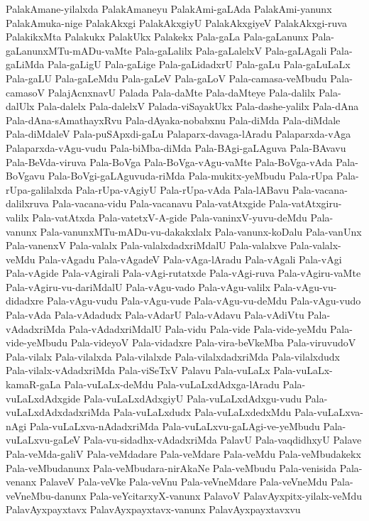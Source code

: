 {PalakAmane-yilalxda
PalakAmaneyu
PalakAmi-gaLAda
PalakAmi-yanunx
PalakAmuka-nige
PalakAkxgi
PalakAkxgiyU
PalakAkxgiyeV
PalakAkxgi-ruva
PalakikxMta
Palakukx
PalakUkx
Palakekx
Pala-gaLa
Pala-gaLanunx
Pala-gaLanunxMTu-mADu-vaMte
Pala-gaLalilx
Pala-gaLalelxV
Pala-gaLAgali
Pala-gaLiMda
Pala-gaLigU
Pala-gaLige
Pala-gaLidadxrU
Pala-gaLu
Pala-gaLuLaLx
Pala-gaLU
Pala-gaLeMdu
Pala-gaLeV
Pala-gaLoV
Pala-camasa-veMbudu
Pala-camasoV
PalajAcnxnavU
Palada
Pala-daMte
Pala-daMteye
Pala-dalilx
Pala-dalUlx
Pala-dalelx
Pala-dalelxV
Palada-viSayakUkx
Pala-dashe-yalilx
Pala-dAna
Pala-dAna-sAmathayxRvu
Pala-dAyaka-nobabxnu
Pala-diMda
Pala-diMdale
Pala-diMdaleV
Pala-puSApxdi-gaLu
Palaparx-davaga-lAradu
Palaparxda-vAga
Palaparxda-vAgu-vudu
Pala-biMba-diMda
Pala-BAgi-gaLAguva
Pala-BAvavu
Pala-BeVda-viruva
Pala-BoVga
Pala-BoVga-vAgu-vaMte
Pala-BoVga-vAda
Pala-BoVgavu
Pala-BoVgi-gaLAguvuda-riMda
Pala-mukitx-yeMbudu
Pala-rUpa
Pala-rUpa-galilalxda
Pala-rUpa-vAgiyU
Pala-rUpa-vAda
Pala-lABavu
Pala-vacana-dalilxruva
Pala-vacana-vidu
Pala-vacanavu
Pala-vatAtxgide
Pala-vatAtxgiru-valilx
Pala-vatAtxda
Pala-vatetxV-A-gide
Pala-vaninxV-yuvu-deMdu
Pala-vanunx
Pala-vanunxMTu-mADu-vu-dakakxlalx
Pala-vanunx-koDalu
Pala-vanUnx
Pala-vanenxV
Pala-valalx
Pala-valalxdadxriMdalU
Pala-valalxve
Pala-valalx-veMdu
Pala-vAgadu
Pala-vAgadeV
Pala-vAga-lAradu
Pala-vAgali
Pala-vAgi
Pala-vAgide
Pala-vAgirali
Pala-vAgi-rutatxde
Pala-vAgi-ruva
Pala-vAgiru-vaMte
Pala-vAgiru-vu-dariMdalU
Pala-vAgu-vado
Pala-vAgu-valilx
Pala-vAgu-vu-didadxre
Pala-vAgu-vudu
Pala-vAgu-vude
Pala-vAgu-vu-deMdu
Pala-vAgu-vudo
Pala-vAda
Pala-vAdadudx
Pala-vAdarU
Pala-vAdavu
Pala-vAdiVtu
Pala-vAdadxriMda
Pala-vAdadxriMdalU
Pala-vidu
Pala-vide
Pala-vide-yeMdu
Pala-vide-yeMbudu
Pala-videyoV
Pala-vidadxre
Pala-vira-beVkeMba
Pala-viruvudoV
Pala-vilalx
Pala-vilalxda
Pala-vilalxde
Pala-vilalxdadxriMda
Pala-vilalxdudx
Pala-vilalx-vAdadxriMda
Pala-viSeTxV
Palavu
Pala-vuLaLx
Pala-vuLaLx-kamaR-gaLa
Pala-vuLaLx-deMdu
Pala-vuLaLxdAdxga-lAradu
Pala-vuLaLxdAdxgide
Pala-vuLaLxdAdxgiyU
Pala-vuLaLxdAdxgu-vudu
Pala-vuLaLxdAdxdadxriMda
Pala-vuLaLxdudx
Pala-vuLaLxdedxMdu
Pala-vuLaLxva-nAgi
Pala-vuLaLxva-nAdadxriMda
Pala-vuLaLxvu-gaLAgi-ve-yeMbudu
Pala-vuLaLxvu-gaLeV
Pala-vu-sidadhx-vAdadxriMda
PalavU
Pala-vaqdidhxyU
Palave
Pala-veMda-galiV
Pala-veMdadare
Pala-veMdare
Pala-veMdu
Pala-veMbudakekx
Pala-veMbudanunx
Pala-veMbudara-nirAkaNe
Pala-veMbudu
Pala-venisida
Pala-venanx
PalaveV
Pala-veVke
Pala-veVnu
Pala-veVneMdare
Pala-veVneMdu
Pala-veVneMbu-danunx
Pala-veYcitarxyX-vanunx
PalavoV
PalavAyxpitx-yilalx-veMdu
PalavAyxpayxtavx
PalavAyxpayxtavx-vanunx
PalavAyxpayxtavxvu
}
